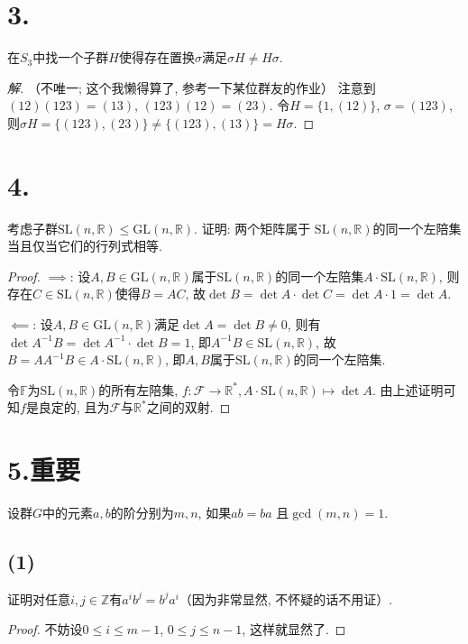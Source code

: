 \documentclass[12pt, a4paper, fontset=windows]{ctexart}
\newcommand{\F}{\mathbb{F}}
\newcommand{\R}{\mathbb{R}}
\newcommand{\Z}{\mathbb{Z}}
\newcommand{\GL}{\mathrm{GL}}
\newcommand{\SL}{\mathrm{SL}}
\newcommand{\kh}[1]{（{#1}）} %
\newenvironment{solution}{\begin{proof}[解]}{\end{proof}}
\begin{document}
\section*{3.}

在$S_3$中找一个子群$H$使得存在置换$\sigma$满足$\sigma H\ne H\sigma$. 

\begin{solution}
\kh{不唯一; 这个我懒得算了, 参考一下某位群友的作业} 
注意到$(12)(123)=(13)$, $(123)(12)=(23)$. 令$H=\{1,(12)\}$, 
$\sigma=(123)$, 则$\sigma H=\{(123),(23)\}\ne\{(123),(13)\}=H\sigma$. 
\end{solution}

\section*{4.}
\label{GL-SL}

考虑子群$\SL(n,\R)\le\GL(n,\R)$. 证明: 两个矩阵属于
$\SL(n,\R)$的同一个左陪集当且仅当它们的行列式相等. 

\begin{proof}
$\implies$: 
设$A,B\in\GL(n,\R)$属于$\SL(n,\R)$的同一个左陪集$A\cdot\SL(n,\R)$, 
则存在$C\in\SL(n,\R)$使得$B=AC$, 故$\det B=\det A\cdot\det C=\det A\cdot 1=\det A$. 

$\impliedby$: 
设$A,B\in\GL(n,\R)$满足$\det A=\det B\ne 0$, 则有$\det A^{-1}B=\det A^{-1}\cdot\det B=1$, 
即$A^{-1}B\in\SL(n,\R)$, 故$B=AA^{-1}B\in A\cdot\SL(n,\R)$, 
即$A,B$属于$\SL(n,\R)$的同一个左陪集. 

令$\F$为$\SL(n,\R)$的所有左陪集, $f:\mathcal{F}\to\R^*,A\cdot\SL(n,\R)\mapsto\det A$. 
由上述证明可知$f$是良定的, 且为$\mathcal{F}$与$\R^*$之间的双射. 
\end{proof}

\section*{5.\normalsize 重要}

设群$G$中的元素$a,b$的阶分别为$m,n$, 如果$ab=ba$
且$\gcd(m,n)=1$. 

\subsection*{(1)}

证明对任意$i,j\in\Z$有$a^ib^j=b^ja^i$\kh{因为非常显然, 不怀疑的话不用证}. 

\begin{proof}
不妨设$0\le i\le m-1$, $0\le j\le n-1$, 这样就显然了. 
\end{proof}
\end{document}
